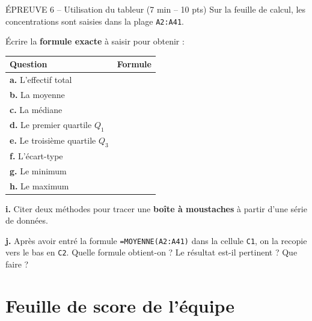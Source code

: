 \documentclass[11pt,a4paper]{article}
\begin{document}
\begin{epreuve}{ÉPREUVE 6 -- Utilisation du tableur \hfill \small (7 min -- 10 pts)}
Sur la feuille de calcul, les concentrations sont saisies dans la plage \texttt{A2:A41}.

\vspace{0.2cm}
Écrire la \textbf{formule exacte} à saisir pour obtenir :

\vspace{0.2cm}
\begin{center}
\renewcommand{\arraystretch}{1.5}
\begin{tabular}{|l|l|}
\hline
\textbf{Question} & \textbf{Formule} \\
\hline
\textbf{a.} L'effectif total & \\
\hline
\textbf{b.} La moyenne & \\
\hline
\textbf{c.} La médiane & \\
\hline
\textbf{d.} Le premier quartile $Q_1$ & \\
\hline
\textbf{e.} Le troisième quartile $Q_3$ & \\
\hline
\textbf{f.} L'écart-type & \\
\hline
\textbf{g.} Le minimum & \\
\hline
\textbf{h.} Le maximum & \\
\hline
\end{tabular}
\end{center}

\vspace{0.2cm}
\textbf{i.} Citer deux méthodes pour tracer une \textbf{boîte à moustaches} à partir d'une série de données.

\vspace{0.2cm}
\textbf{j.} Après avoir entré la formule \texttt{=MOYENNE(A2:A41)} dans la cellule \texttt{C1}, on la recopie vers le bas en \texttt{C2}. Quelle formule obtient-on ? Le résultat est-il pertinent ? Que faire ?
\end{epreuve}

\newpage

\section*{\color{biocolor}Feuille de score de l'équipe}
\end{document}
